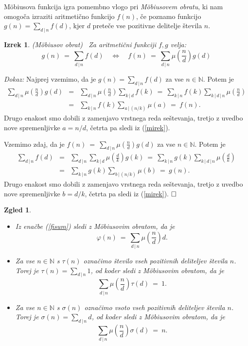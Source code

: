 \documentclass[a4paper,12pt]{article}
\def\N{\mathbb{N}} %
\def\qed{$\hfill\Box$}   %
\newtheorem{izrek}{Izrek}
\newtheorem{zgled}{Zgled}
\begin{document}
M\"obiusova funkcija igra pomembno vlogo pri {\em M\"obiusovem obratu}, ki nam omogoča
izraziti aritmetično funkcijo $f(n)$, če poznamo funkcijo $g(n) = \sum_{d\,|\,n} f(d)$,
kjer $d$ preteče vse pozitivne delitelje števila $n$.

\begin{izrek} \em{(M\"obiusov obrat)} \ 
Za aritmetični funkciji $f, g$ velja:
\[
g(n)\ =\ \sum_{d\,|\,n} f(d)\quad \Longleftrightarrow\quad f(n)\ =\ \sum_{d\,|\,n} \mu\left(\frac{n}{d}\right)g(d)
\]
\end{izrek}

\noindent
{\em Dokaz:\/} 
Najprej vzemimo, da je $g(n) = \sum_{d\,|\,n} f(d)$ za vse $n \in \N$. Potem je
\begin{eqnarray*}
\sum_{d\,|\,n} \mu\left(\frac{n}{d}\right)g(d)
 &=& \sum_{d\,|\,n} \mu\left(\frac{n}{d}\right)\sum_{k\,|\,d} f(k)
\ =\ \sum_{k\,|\,n} f(k) \sum_{k\,|\,d\,|\,n} \mu\left(\frac{n}{d}\right) \\
 &=& \sum_{k\,|\,n} f(k) \sum_{a\,|\,(n/k)} \mu\left(a\right)\ =\ f(n).
 \end{eqnarray*}
Drugo enakost smo dobili z zamenjavo vrstnega reda seštevanja, tretjo z uvedbo nove spremenljivke $a = n/d$,
četrta pa sledi iz (\ref{mirek}).

Vzemimo zdaj, da je $f(n)\ =\ \sum_{d\,|\,n} \mu\left(\frac{n}{d}\right)g(d)$ za vse $n \in \N$. Potem je
\begin{eqnarray*}
\sum_{d\,|\,n} f(d)
 &=& \sum_{d\,|\,n} \sum_{k\,|\,d} \mu\left(\frac{d}{k}\right) g(k)
\ =\ \sum_{k\,|\,n} g(k) \sum_{k\,|\,d\,|\,n} \mu\left(\frac{d}{k}\right) \\
 &=& \sum_{k\,|\,n} g(k) \sum_{b\,|\,(n/k)} \mu\left(b\right)\ =\ g(n).
 \end{eqnarray*}
Drugo enakost smo dobili z zamenjavo vrstnega reda seštevanja, tretjo z uvedbo nove spremenljivke $b = d/k$,
četrta pa sledi iz (\ref{mirek}). \qed


\begin{zgled}
\label{tau}
\begin{itemize}
\item Iz enačbe (\ref{fisum}) sledi z M\"obiusovim obratom, da je 
\[
\varphi(n)\ =\ \sum_{d\,|\,n}\mu\left(\frac{n}{d}\right)d.
\]
\item Za vse $n \in \N$ s $\tau(n)$ označimo število vseh pozitivnih deliteljev števila $n$.
Torej je $\tau(n) = \sum_{d\,|\,n} 1$, od koder sledi z M\"obiusovim obratom, da je 
\[
\sum_{d\,|\,n}\mu\left(\frac{n}{d}\right)\tau(d)\ =\ 1.
\]
\item Za vse $n \in \N$ s $\sigma(n)$ označimo vsoto vseh pozitivnih deliteljev števila $n$.
Torej je $\sigma(n) = \sum_{d\,|\,n} d$, od koder sledi z M\"obiusovim obratom, da je 
\[
\sum_{d\,|\,n}\mu\left(\frac{n}{d}\right)\sigma(d)\ =\ n.
\]
\end{itemize}
\end{zgled}
\end{document}

